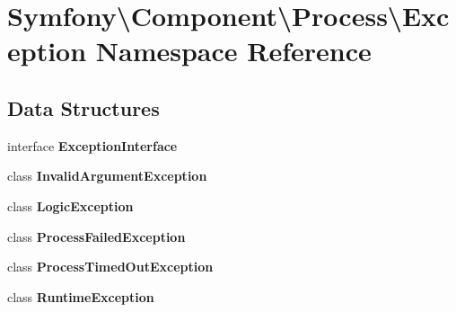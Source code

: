 \section{Symfony\textbackslash{}Component\textbackslash{}Process\textbackslash{}Exception Namespace Reference}
\label{namespace_symfony_1_1_component_1_1_process_1_1_exception}
\subsection*{Data Structures}
\begin{DoxyCompactItemize}
\item 
interface {\bf Exception\+Interface}
\item 
class {\bf Invalid\+Argument\+Exception}
\item 
class {\bf Logic\+Exception}
\item 
class {\bf Process\+Failed\+Exception}
\item 
class {\bf Process\+Timed\+Out\+Exception}
\item 
class {\bf Runtime\+Exception}
\end{DoxyCompactItemize}
